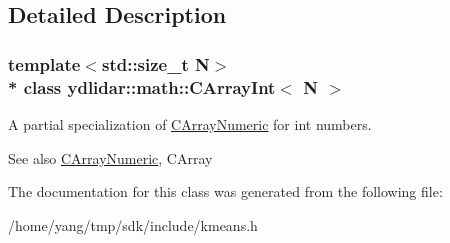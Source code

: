 \subsection{Detailed Description}
\subsubsection*{template$<$std\+::size\+\_\+t N$>$\\*
class ydlidar\+::math\+::\+C\+Array\+Int$<$ N $>$}

A partial specialization of \hyperlink{classydlidar_1_1math_1_1_c_array_numeric}{C\+Array\+Numeric} for int numbers. \begin{DoxySeeAlso}{See also}
\hyperlink{classydlidar_1_1math_1_1_c_array_numeric}{C\+Array\+Numeric}, C\+Array 
\end{DoxySeeAlso}


The documentation for this class was generated from the following file\+:\begin{DoxyCompactItemize}
\item 
/home/yang/tmp/sdk/include/kmeans.\+h\end{DoxyCompactItemize}

